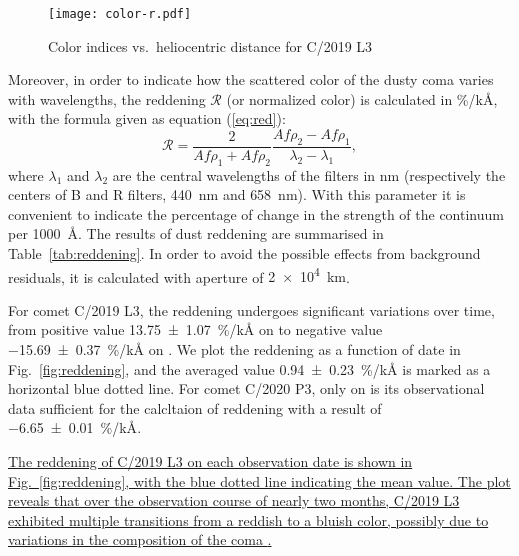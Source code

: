 \begin{figure}
    \centering
    \texttt{[image: color-r.pdf]} 
    \caption{Color indices vs.\ heliocentric distance for C/2019 L3}\label{fig:color-r}
\end{figure}

Moreover, in order to indicate how the scattered color of the dusty coma varies with wavelengths, the reddening $\mathcal{R}$ (or normalized color) \citep{jewitt_cometary_1986, lara_behaviour_2003, mazzotta_epifani_dust_2011, shi_ccd_2015} is calculated in \si{\percent/\kilo\angstrom}, with the formula given as equation (\ref{eq:red}): 
\begin{equation}
\mathcal{R} = \frac{2}{Af\rho_1 + Af\rho_2} \frac{Af\rho_2 - Af\rho_1}{\lambda_2 - \lambda_1}, 
\label{eq:red}
\end{equation}
where $\lambda_1$ and $\lambda_2$ are the central wavelengths of the filters in \si{\nm} (respectively the centers of B and R filters, {\SI{440}{\nm}} and {\SI{658}{\nm}}). With this parameter it is convenient to indicate the percentage of change in the strength of the continuum per {\SI{1000}{\angstrom}}. The results of dust reddening are summarised in Table~\ref{tab:reddening}. In order to avoid the possible effects from background residuals, it is calculated with aperture of {\SI{2e4}{\km}}. 

For comet C/2019 L3, the reddening undergoes significant variations over time, from positive value {\SI{13.75 +- 1.07}{\percent/\kilo\angstrom}} on  to negative value {\SI{-15.69 +- 0.37}{\percent/\kilo\angstrom}} on . We plot the reddening as a function of date in Fig.~\ref{fig:reddening}, and the averaged value {\SI{0.94 +- 0.23}{\percent/\kilo\angstrom}} is marked as a horizontal blue dotted line. For comet C/2020 P3, only on  is its observational data sufficient for the calcltaion of reddening with a result of {\SI{-6.65 +- 0.01}{\percent/\kilo\angstrom}}. 

\ul{The reddening of C/2019 L3 on each observation date is shown in Fig.~\ref{fig:reddening}, with the blue dotted line indicating the mean value. The plot reveals that over the observation course of nearly two months, C/2019 L3 exhibited multiple transitions from a reddish to a bluish color, possibly due to variations in the composition of the coma \citep{ivanova_colour_2017}.}

